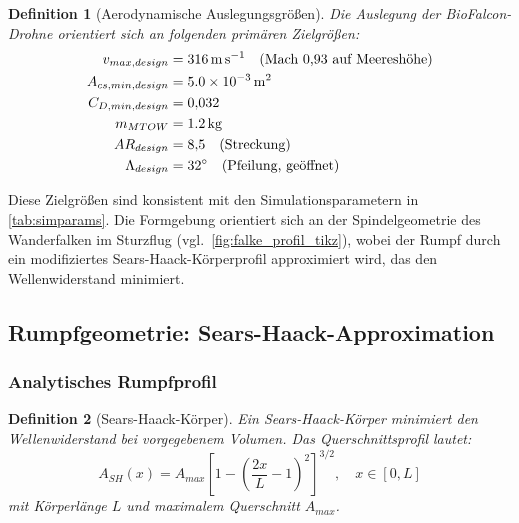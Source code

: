 ﻿\documentclass[12pt,a4paper]{article}
\newtheorem{definition}{Definition}[section]
\theoremstyle{remark}
\begin{document}
	\begin{definition}[Aerodynamische Auslegungsgrößen]
		\label{def:auslegung}
		Die Auslegung der BioFalcon-Drohne orientiert sich an folgenden primären
		Zielgrößen:
		\begin{align}
			v_{max,design}     &= \SI{316}{\m\per\second} \quad\text{(Mach 0{,}93 auf Meereshöhe)} \\
			A_{cs,min,design}  &= \SI{5{,}0e-3}{\m^2}                                               \\
			C_{D,min,design}   &= 0{,}032                                                            \\
			m_{MTOW}           &= \SI{1{,}2}{\kg}                                                    \\
			AR_{design}        &= 8{,}5 \quad\text{(Streckung)}                                      \\
			\Lambda_{design}   &= 32^{\circ} \quad\text{(Pfeilung, geöffnet)}
		\end{align}
	\end{definition}
	
	Diese Zielgrößen sind konsistent mit den Simulationsparametern in
	\cref{tab:simparams}.  Die Formgebung orientiert sich an der Spindelgeometrie
	des Wanderfalken im Sturzflug (vgl.\ \cref{fig:falke_profil_tikz}), wobei der
	Rumpf durch ein modifiziertes Sears-Haack-Körperprofil approximiert wird, das
	den Wellenwiderstand minimiert.
	
	\subsection{Rumpfgeometrie: Sears-Haack-Approximation}
	\label{sec:rumpf}
	
	\subsubsection{Analytisches Rumpfprofil}
	
	\begin{definition}[Sears-Haack-Körper]
		\label{def:searhaack}
		Ein Sears-Haack-Körper minimiert den Wellenwiderstand bei vorgegebenem Volumen.
		Das Querschnittsprofil lautet:
		\begin{equation}
			A_{SH}(x) = A_{max}\left[1 - \left(\frac{2x}{L} - 1\right)^2\right]^{3/2},
			\quad x \in [0, L]
			\label{eq:sears_haack}
		\end{equation}
		mit Körperlänge $L$ und maximalem Querschnitt $A_{max}$.
	\end{definition}
	
\end{document}
